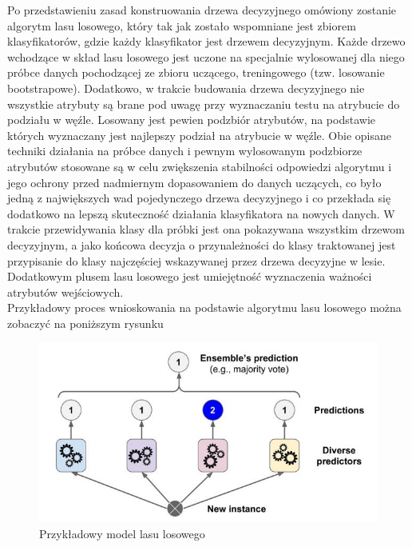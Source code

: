 Po przedstawieniu zasad konstruowania drzewa decyzyjnego omówiony zostanie algorytm lasu losowego, który tak jak zostało wspomniane jest zbiorem klasyfikatorów, gdzie każdy klasyfikator jest drzewem decyzyjnym. Każde drzewo wchodzące w skład lasu losowego jest uczone na specjalnie wylosowanej dla niego próbce danych pochodzącej ze zbioru uczącego, treningowego (tzw. losowanie bootstrapowe). Dodatkowo, w trakcie budowania drzewa decyzyjnego nie wszystkie atrybuty są brane pod uwagę przy wyznaczaniu testu na atrybucie do podziału w węźle. Losowany jest pewien podzbiór atrybutów, na podstawie których wyznaczany jest najlepszy podział na atrybucie w węźle. Obie opisane techniki działania na próbce danych i pewnym wylosowanym podzbiorze atrybutów stosowane są w celu zwiększenia stabilności odpowiedzi algorytmu i jego ochrony przed nadmiernym dopasowaniem do danych uczących, co było jedną z największych wad pojedynczego drzewa decyzyjnego i co przekłada się dodatkowo na lepszą skuteczność działania klasyfikatora na nowych danych. W trakcie przewidywania klasy dla próbki jest ona pokazywana wszystkim drzewom decyzyjnym, a jako końcowa decyzja o przynależności do klasy traktowanej jest przypisanie do klasy najczęściej wskazywanej przez drzewa decyzyjne w lesie. Dodatkowym plusem lasu losowego jest umiejętność wyznaczenia ważności atrybutów wejściowych. \cite{PPlonski}\\

Przykładowy proces wnioskowania na podstawie algorytmu lasu losowego można zobaczyć na poniższym rysunku
\begin{figure}[h] 
        \centering\includegraphics[width=14cm]{figures/randomForestModel.JPG}
        \caption{Przykładowy model lasu losowego \cite{Geron}}
\end{figure}

\newpage

